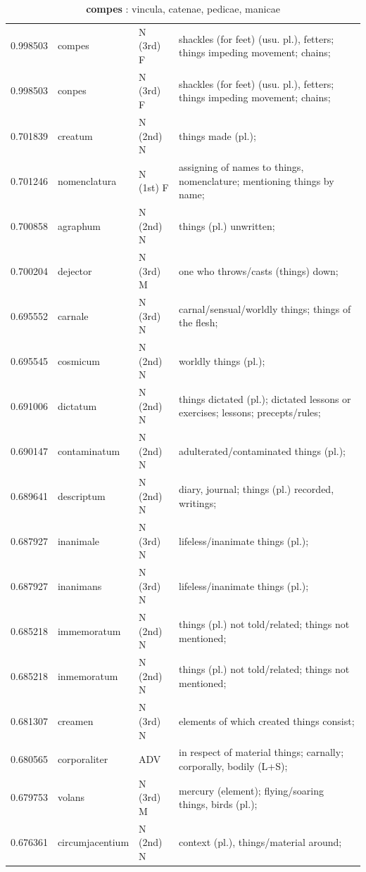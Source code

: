 \documentclass[]{article}
\begin{document}
	\begin{table}
	\caption{\textbf{compes} : vincula, catenae, pedicae, manicae \label{compes}}
	\vspace{.25in}
	\begin{tabular}{l|lll}
	   0.998503 & compes & N (3rd) F & shackles (for feet) (usu. pl.), fetters; things impeding movement; chains;\\
	   0.998503 & conpes & N (3rd) F & shackles (for feet) (usu. pl.), fetters; things impeding movement; chains;\\
	   0.701839 & creatum & N (2nd) N & things made (pl.);\\
	   0.701246 & nomenclatura & N (1st) F & assigning of names to things, nomenclature; mentioning things by name;\\
	   0.700858 & agraphum & N (2nd) N & things (pl.) unwritten;\\
	   0.700204 & dejector & N (3rd) M & one who throws/casts (things) down;\\
	   0.695552 & carnale & N (3rd) N & carnal/sensual/worldly things; things of the flesh;\\
	   0.695545 & cosmicum & N (2nd) N & worldly things (pl.);\\
	   0.691006 & dictatum & N (2nd) N & things dictated (pl.); dictated lessons or exercises; lessons; precepts/rules;\\
	   0.690147 & contaminatum & N (2nd) N & adulterated/contaminated things (pl.);\\
	   0.689641 & descriptum & N (2nd) N & diary, journal; things (pl.) recorded, writings;\\
	   0.687927 & inanimale & N (3rd) N & lifeless/inanimate things (pl.);\\
	   0.687927 & inanimans & N (3rd) N & lifeless/inanimate things (pl.);\\
	   0.685218 & immemoratum & N (2nd) N & things (pl.) not told/related; things not mentioned;\\
	   0.685218 & inmemoratum & N (2nd) N & things (pl.) not told/related; things not mentioned;\\
	   0.681307 & creamen & N (3rd) N & elements of which created things consist;\\
	   0.680565 & corporaliter & ADV & in respect of material things; carnally; corporally, bodily (L+S);\\
	   0.679753 & volans & N (3rd) M & mercury (element); flying/soaring things, birds (pl.);\\
	   0.676361 & circumjacentium & N (2nd) N & context (pl.), things/material around;\\

\end{tabular}
\end{table}
\end{document}
